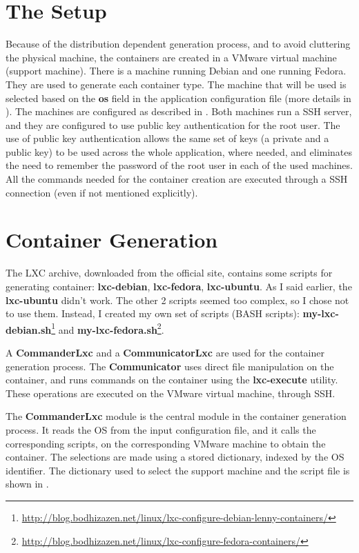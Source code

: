 \section{The Setup}
\label{sec:lxc-setup}
Because of the distribution dependent generation process, and to avoid
cluttering the physical machine, the containers are created in a VMware virtual
machine (support machine). There is a machine running Debian and one running
Fedora. They are used to generate each container type. The machine that will be
used is selected based on the \textbf{os} field in the application
configuration file (more details in ). The
machines are configured as described in
.  Both machines run a SSH
server, and they are configured to use public key authentication for the root
user. The use of public key authentication allows the same set of keys (a
private and a public key) to be used across the whole application, where
needed, and eliminates the need to remember the password of the root user in
each of the used machines. All the commands needed for the container creation
are executed through a SSH connection (even if not mentioned explicitly). 

\section{Container Generation}
\label{sec:lxc-gen}
The LXC archive, downloaded from the official site, contains some scripts for
generating container: \textbf{lxc-debian}, \textbf{lxc-fedora},
\textbf{lxc-ubuntu}. As I said earlier, the \textbf{lxc-ubuntu} didn't work.
The other 2 scripts seemed too complex, so I chose not to use them. Instead, I
created my own set of scripts (BASH scripts):
\textbf{my-lxc-debian.sh}\footnote{\url{http://blog.bodhizazen.net/linux/lxc-configure-debian-lenny-containers/}}
and
\textbf{my-lxc-fedora.sh}\footnote{\url{http://blog.bodhizazen.net/linux/lxc-configure-fedora-containers/}}.

A \textbf{CommanderLxc} and a \textbf{CommunicatorLxc} are used for the
container generation process. The \textbf{Communicator} uses direct file
manipulation on the container, and runs commands on the container using the
\textbf{lxc-execute} utility. These operations are executed on the VMware
virtual machine, through SSH.

The \textbf{CommanderLxc} module is the central module in the container
generation process. It reads the OS from the input configuration file, and it
calls the corresponding scripts, on the corresponding VMware machine to obtain
the container. The selections are made using a stored dictionary, indexed by
the OS identifier. The dictionary used to select the support machine and the script file is shown in .


